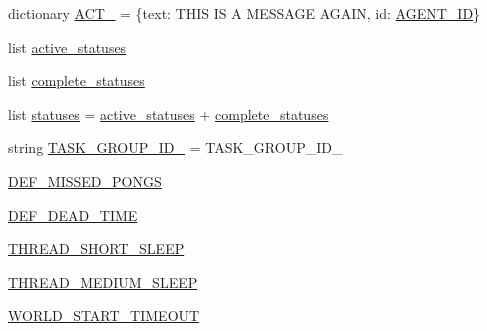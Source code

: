 \begin{DoxyCompactItemize}
\item 
dictionary \hyperlink{namespaceparlai_1_1mturk_1_1core_1_1dev_1_1test_1_1test__full__system_a872d18b3ab4429011c0815723fa37f1a}{A\+C\+T\+\_} = \{\textquotesingle{}text\textquotesingle{}\+: \textquotesingle{}T\+H\+IS IS A M\+E\+S\+S\+A\+GE A\+G\+A\+IN\textquotesingle{}, \textquotesingle{}id\textquotesingle{}\+: \hyperlink{namespaceparlai_1_1mturk_1_1core_1_1dev_1_1test_1_1test__full__system_aa1831871da6e75a782b3358b3699ea2a}{A\+G\+E\+N\+T\+\_\+\+ID}\}
\item 
list \hyperlink{namespaceparlai_1_1mturk_1_1core_1_1dev_1_1test_1_1test__full__system_a0ef75bc34e0f8e27fae056f8fd7a43e1}{active\+\_\+statuses}
\item 
list \hyperlink{namespaceparlai_1_1mturk_1_1core_1_1dev_1_1test_1_1test__full__system_a52534c310e68bf8713d59670b69156a9}{complete\+\_\+statuses}
\item 
list \hyperlink{namespaceparlai_1_1mturk_1_1core_1_1dev_1_1test_1_1test__full__system_a0601fe69e1f2c5c0cece90a5af7d187a}{statuses} = \hyperlink{namespaceparlai_1_1mturk_1_1core_1_1dev_1_1test_1_1test__full__system_a0ef75bc34e0f8e27fae056f8fd7a43e1}{active\+\_\+statuses} + \hyperlink{namespaceparlai_1_1mturk_1_1core_1_1dev_1_1test_1_1test__full__system_a52534c310e68bf8713d59670b69156a9}{complete\+\_\+statuses}
\item 
string \hyperlink{namespaceparlai_1_1mturk_1_1core_1_1dev_1_1test_1_1test__full__system_a3a92346ddc826debcba08922a4fa2956}{T\+A\+S\+K\+\_\+\+G\+R\+O\+U\+P\+\_\+\+I\+D\+\_} = \textquotesingle{}T\+A\+S\+K\+\_\+\+G\+R\+O\+U\+P\+\_\+\+I\+D\+\_\textquotesingle{}
\item 
\hyperlink{namespaceparlai_1_1mturk_1_1core_1_1dev_1_1test_1_1test__full__system_a4ba3235c9d30e046777e23767bc15c59}{D\+E\+F\+\_\+\+M\+I\+S\+S\+E\+D\+\_\+\+P\+O\+N\+GS}
\item 
\hyperlink{namespaceparlai_1_1mturk_1_1core_1_1dev_1_1test_1_1test__full__system_ae584ff46f44b8ec0e15fd9b9bb560db8}{D\+E\+F\+\_\+\+D\+E\+A\+D\+\_\+\+T\+I\+ME}
\item 
\hyperlink{namespaceparlai_1_1mturk_1_1core_1_1dev_1_1test_1_1test__full__system_aa1f122fcb4e76e1448642d3e15aebdd4}{T\+H\+R\+E\+A\+D\+\_\+\+S\+H\+O\+R\+T\+\_\+\+S\+L\+E\+EP}
\item 
\hyperlink{namespaceparlai_1_1mturk_1_1core_1_1dev_1_1test_1_1test__full__system_af0b64282383700e0417cbb5be128afe7}{T\+H\+R\+E\+A\+D\+\_\+\+M\+E\+D\+I\+U\+M\+\_\+\+S\+L\+E\+EP}
\item 
\hyperlink{namespaceparlai_1_1mturk_1_1core_1_1dev_1_1test_1_1test__full__system_a8ea9e16bce1773521c84724a237c232d}{W\+O\+R\+L\+D\+\_\+\+S\+T\+A\+R\+T\+\_\+\+T\+I\+M\+E\+O\+UT}

\end{DoxyCompactItemize}
